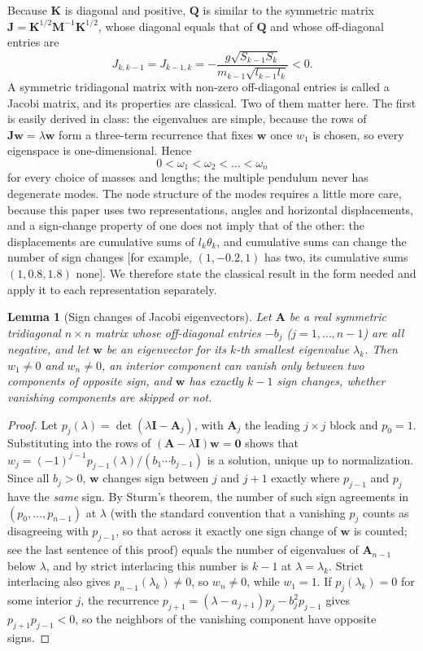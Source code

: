 \documentclass[11pt]{article}
\newtheorem{lemma}{Lemma}
\newcommand{\M}{\mathbf{M}}
\newcommand{\K}{\mathbf{K}}
\newcommand{\Q}{\mathbf{Q}}
\newcommand{\J}{\mathbf{J}}
\begin{document}
Because $\K$ is diagonal and positive, $\Q$ is similar to the symmetric matrix $\J=\K^{1/2}\M^{-1}\K^{1/2}$, whose diagonal equals that of $\Q$ and whose off-diagonal entries are
\begin{equation}\label{eq:J}
  J_{k,k-1}=J_{k-1,k}=-\frac{g\sqrt{S_{k-1}S_k}}{m_{k-1}\sqrt{l_{k-1}l_k}}<0 .
\end{equation}
A symmetric tridiagonal matrix with non-zero off-diagonal entries is called a Jacobi matrix, and its properties are classical.\cite{gantmacher2002oscillation} Two of them matter here. The first is easily derived in class: the eigenvalues are simple, because the rows of $\J\mathbf{w}=\lambda\mathbf{w}$ form a three-term recurrence that fixes $\mathbf{w}$ once $w_1$ is chosen, so every eigenspace is one-dimensional. Hence
\[
0<\omega_1<\omega_2<\dots<\omega_n
\]
for every choice of masses and lengths; the multiple pendulum never has degenerate modes. The node structure of the modes requires a little more care, because this paper uses two representations, angles and horizontal displacements, and a sign-change property of one does not imply that of the other: the displacements are cumulative sums of $l_k\theta_k$, and cumulative sums can change the number of sign changes [for example, $(1,-0.2,1)$ has two, its cumulative sums $(1,0.8,1.8)$ none]. We therefore state the classical result in the form needed and apply it to each representation separately.

\begin{lemma}[Sign changes of Jacobi eigenvectors]\label{lem:nodes}
Let $\mathbf{A}$ be a real symmetric tridiagonal $n\times n$ matrix whose off-diagonal entries $-b_j$ ($j=1,\dots,n-1$) are all negative, and let $\mathbf{w}$ be an eigenvector for its $k$-th smallest eigenvalue $\lambda_k$. Then $w_1\neq0$ and $w_n\neq0$, an interior component can vanish only between two components of opposite sign, and $\mathbf{w}$ has exactly $k-1$ sign changes, whether vanishing components are skipped or not.
\end{lemma}
\begin{proof}
Let $p_j(\lambda)=\det(\lambda\mathbf{I}-\mathbf{A}_j)$, with $\mathbf{A}_j$ the leading $j\times j$ block and $p_0=1$. Substituting into the rows of $(\mathbf{A}-\lambda\mathbf{I})\mathbf{w}=\mathbf{0}$ shows that $w_j=(-1)^{j-1}p_{j-1}(\lambda)/(b_1\cdots b_{j-1})$ is a solution, unique up to normalization. Since all $b_j>0$, $\mathbf{w}$ changes sign between $j$ and $j+1$ exactly where $p_{j-1}$ and $p_j$ have the \emph{same} sign. By Sturm's theorem, the number of such sign agreements in $(p_0,\dots,p_{n-1})$ at $\lambda$ (with the standard convention that a vanishing $p_j$ counts as disagreeing with $p_{j-1}$, so that across it exactly one sign change of $\mathbf{w}$ is counted; see the last sentence of this proof) equals the number of eigenvalues of $\mathbf{A}_{n-1}$ below $\lambda$, and by strict interlacing this number is $k-1$ at $\lambda=\lambda_k$. Strict interlacing also gives $p_{n-1}(\lambda_k)\neq0$, so $w_n\neq0$, while $w_1=1$. If $p_{j}(\lambda_k)=0$ for some interior $j$, the recurrence $p_{j+1}=(\lambda-a_{j+1})p_j-b_j^2p_{j-1}$ gives $p_{j+1}p_{j-1}<0$, so the neighbors of the vanishing component have opposite signs.
\end{proof}
\end{document}
